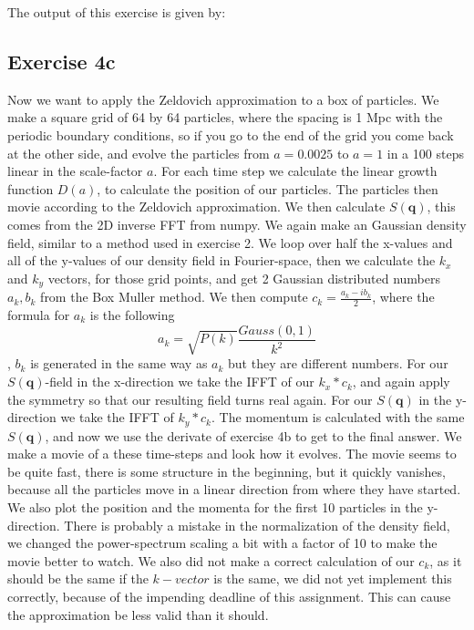 The output of this exercise is given by:



\subsection{Exercise 4c}
Now we want to apply the Zeldovich approximation to a box of particles. We make a square grid of 64 by 64 particles, where the spacing is 1 Mpc with the periodic boundary conditions, so if you go to the end of the grid you come back at the other side, and evolve the particles from $a=0.0025$ to $a=1$ in a 100 steps linear in the scale-factor $a$. For each time step we calculate the linear growth function $D(a)$, to calculate the position of our particles. The particles then movie according to the Zeldovich approximation. We then calculate $S(\textbf{q})$, this comes from the 2D inverse FFT from numpy. We again make an Gaussian density field, similar to a method used in exercise 2. We loop over half the x-values and all of the y-values of our density field in Fourier-space, then we calculate the $k_x$ and $k_y$ vectors, for those grid points, and get 2 Gaussian distributed numbers $a_k,b_k$ from the Box Muller method. We then compute $c_k=\frac{a_k-ib_k}{2}$, where the formula for $a_k$ is the following
\begin{equation}
    a_k=\sqrt{P(k)}\frac{Gauss(0,1)}{k^2}
\end{equation}
, $b_k$ is generated in the same way as $a_k$ but they are different numbers. For our $S(\textbf{q})$-field in the x-direction we take the IFFT of our $k_x*c_k$, and again apply the symmetry so that our resulting field turns real again. For our $S(\textbf{q})$ in the y-direction we take the IFFT of $k_y*c_k$. The momentum is calculated with the same $S(\textbf{q})$, and now we use the derivate of exercise 4b to get to the final answer.
We make a movie of a these time-steps and look how it evolves. The movie seems to be quite fast, there is some structure in the beginning, but it quickly vanishes, because all the particles move in a linear direction from where they have started. We also plot the position and the momenta for the first 10 particles in the y-direction. There is probably a mistake in the normalization of the density field, we changed the power-spectrum scaling a bit with a factor of 10 to make the movie better to watch. We also did not make a correct calculation of our $c_k$, as it should be the same if the $k-vector$ is the same, we did not yet implement this correctly, because of the impending deadline of this assignment. This can cause the approximation be less valid than it should.

